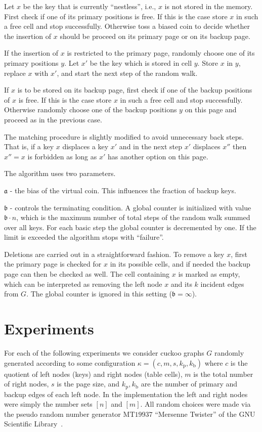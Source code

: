 \let\accentvec\vec \documentclass{llncs}
\newcommand{\kprim}{{k_{\mathrm{p}}}}
\newcommand{\kback}{{k_{\mathrm{b}}}}
\newcommand{\palpha}{\mathfrak{a}}
\newcommand{\pbeta}{\mathfrak{b}}
\newcommand{\ie}{i.e.}
\begin{document}
Let $x$ be the key that is currently ``nestless'', \ie, $x$ is not stored in the memory.
First check if one of its primary positions is free. If this is the case store $x$ in such a free cell and stop successfully. Otherwise toss a biased coin to decide whether the insertion of $x$ should be proceed on its primary page or on its backup page.
\begin{compactitem}\item If the insertion of $x$ is restricted to the primary page, randomly choose one of its primary positions $y$.
Let $x'$ be the key which is stored in cell $y$. Store $x$ in $y$, replace $x$ with $x'$, and start the next step of the random walk.
\item  If $x$ is to be stored on its backup page, first check if 
one of the backup positions of $x$ is free. If this is the case store $x$ in such a free cell and stop successfully. Otherwise randomly choose one of the backup positions $y$ on this page and proceed as in the previous case.
\end{compactitem}

The matching procedure is slightly modified to avoid unnecessary back steps. That is, if a key $x$ displaces a key $x'$ and in the next step $x'$ displaces $x''$ then $x''=x$ is forbidden as long as $x'$ has another option on this page.

The algorithm uses two parameters. 
 \begin{compactitem}
 \item [$\palpha$] - the bias of the virtual coin. This influences the fraction of backup keys. 
 \item [$\pbeta$]  - controls the terminating condition. A global counter is initialized with value $\pbeta\cdot n$, which is the maximum number of total steps of the random walk summed over all keys. For each basic step the global counter is decremented by one. If the limit is exceeded the algorithm stops with ``failure''.
 \end{compactitem}

Deletions are carried out in a straightforward fashion. To remove a
key $x$, first the primary page is checked for $x$ in its possible
cells, and if needed the backup page can then be checked as well.  The
cell containing $x$ is marked as empty, which can be interpreted as
removing the left node $x$ and its $k$ incident edges from $G$. The
global counter is ignored in this setting ($\pbeta = \infty$).

\section{Experiments}
For each of the following experiments we consider cuckoo graphs $G$ randomly generated according to some configuration 
$\kappa=(c,m,s, \kprim, \kback)$ where $c$ is the quotient of left nodes (keys) and right nodes (table cells), $m$ is the total number of right nodes, $s$ is the page size, and $\kprim,\kback$ are the number of primary and backup edges of each left node.
In the implementation the left and right nodes were simply the number sets $[n]$ and $[m]$. All random choices were made via
the pseudo random number generator {$\mathrm{MT}19937$} ``Mersenne Twister'' of the GNU Scientific Library~\cite{GNU_Scientific}.
\end{document}
